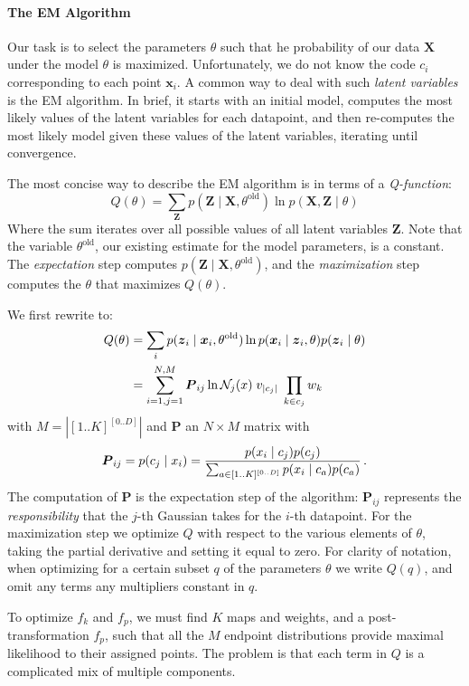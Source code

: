 \documentclass[reprint,amsmath,amssymb,aps,prl]{revtex4-1}
\newcommand{\p}{\mbox{\,.}}
\newcommand{\cN}{{\cal N}}
\newcommand{\bx}{\boldsymbol x}
\newcommand{\bX}{\boldsymbol X}
\newcommand{\bZ}{\boldsymbol Z}
\newcommand{\bz}{\boldsymbol z}
\newcommand{\bP}{\boldsymbol P}
\begin{document}
\paragraph{The EM Algorithm}
\label{section:algorithm}

Our task is to select the parameters $\theta$ such that he probability of our data $\bX$ under the model $\theta$ is maximized. Unfortunately, we do not know the code $c_i$ corresponding to each point $\bx_i$. A common way to deal with such \emph{latent variables} is the EM algorithm. In brief, it starts with an initial model, computes the most likely values of the latent variables for each datapoint, and then re-computes the most likely model given these values of the latent variables, iterating until convergence.

The most concise way to describe the EM algorithm is in terms of a \emph{Q-function}:
\[
Q(\theta) = \sum_{\bZ} p(\bZ \mid \bX, \theta^\text{old}) \ln p(\bX, \bZ \mid \theta) \label{line:q-function}
\]
Where the sum iterates over all possible values of all latent variables $\bZ$. Note that the variable $\theta^\text{old}$, our existing estimate for the model parameters, is a constant. The \emph{expectation} step computes $p(\bZ \mid \bX, \theta^\text{old})$, and the \emph{maximization} step computes the $\theta$ that maximizes $Q(\theta)$. 

We first rewrite to:
\begin{align*}
Q(\theta) &= \sum_{i} p(\bz_i \mid \bx_i, \theta^\text{old}) \ln p(\bx_i \mid \bz_i, \theta) p(\bz_i \mid \theta) \\
     &= \sum_{i=1,j=1}^{N, M} \bP_{ij} \ln \cN_j(x) \;v_{|c_j|}\; \prod_{k\in c_j}w_k 
\end{align*}
with $M = |[1 .. K]^{[0 .. D]}|$ and $\bP$ an $N\times M$ matrix with 
\[
\bP_{ij} = p(c_j \mid x_i) = \frac{p(x_i\mid c_j) p(c_j) }{\sum_{a \in [1 .. K]^{[0 .. D]}} p(x_i\mid c_a) p(c_a)} \p 
\]
The computation of $\bP$ is the expectation step of the algorithm: $\bP_{ij}$ represents the \emph{responsibility} that the $j$-th Gaussian takes for the $i$-th datapoint. For the maximization step we optimize $Q$ with respect to the various elements of $\theta$, taking the partial derivative and setting it equal to zero. For clarity of notation, when optimizing for a certain subset $q$ of the parameters $\theta$ we write $Q(q)$, and omit any terms any multipliers constant in $q$.

To optimize $f_k$ and $f_p$, we must find $K$ maps and weights, and a post-transformation $f_p$, such that all the $M$ endpoint distributions provide maximal likelihood to their assigned points. The problem is that each term in $Q$ is a complicated mix of multiple components.
\end{document}

